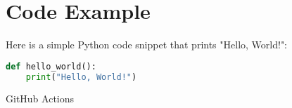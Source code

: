 \section{Code Example}
Here is a simple Python code snippet that prints "Hello, World!":

\begin{lstlisting}[language=Python]
def hello_world():
    print("Hello, World!")
\end{lstlisting}



GitHub Actions \cite{github_actions_docs}